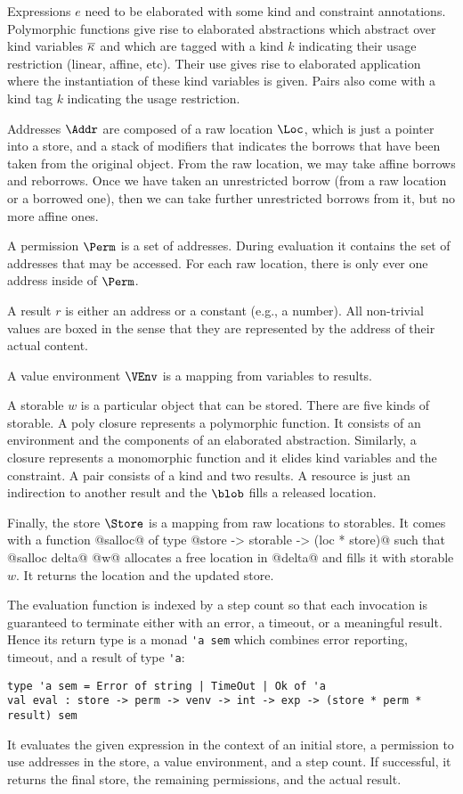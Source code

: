 Expressions $e$ need to be elaborated with some kind and constraint
annotations. Polymorphic functions give rise to elaborated
abstractions which abstract over kind variables $\overline{\kappa_{{}}}$ and
which are tagged with a kind $k$ indicating their usage restriction
(linear, affine, etc). Their use
gives rise to elaborated application where the instantiation of these
kind variables is given. Pairs also come with a kind tag $k$
indicating the usage restriction.

Addresses $\Addr$ are composed of a raw location $\Loc$, which is just
a pointer into a store, and a stack of modifiers that indicates the
borrows that have been taken from the original object. From the raw
location, we may take affine borrows and reborrows. Once we have
taken an unrestricted borrow (from a raw location or a borrowed one),
then we can take further unrestricted borrows from it, but no more
affine ones.

A permission $\Perm$ is a set of addresses. During evaluation it
contains the set of addresses that may be accessed. For each raw
location, there is only ever one address inside of $\Perm$.

A result $r$ is either an address or a constant (e.g., a number). All
non-trivial values are boxed in the sense that they are represented by
the address of their actual content.

A value environment $\VEnv$ is a mapping from variables to results.

A storable $w$ is a particular object that can be stored. There are five
kinds of storable. A poly closure represents a polymorphic
function. It consists of an environment and the components of an
elaborated abstraction. Similarly, a closure represents a monomorphic
function and it elides kind variables and the constraint. A pair
consists of a kind and two results. A resource is just an indirection
to another result and the $\blob $ fills a released location.

Finally, the store $\Store$ is a mapping from raw locations to
storables. It comes with a function
@salloc@ of type @store -> storable -> (loc * store)@ such that
@salloc delta@ @w@ allocates a free location in @delta@ and fills it with
storable $w$. It returns the location and the updated store.


The evaluation function is indexed by a step count so that each
invocation is guaranteed to terminate either with an error, a timeout,
or a meaningful result. Hence its return type is a monad
\lstinline/'a sem/ which combines error reporting, timeout, and a
result of type \lstinline/'a/:
\begin{lstlisting}
type 'a sem = Error of string | TimeOut | Ok of 'a
val eval : store -> perm -> venv -> int -> exp -> (store * perm * result) sem
\end{lstlisting}
It evaluates the given expression in the context of an initial store, a
permission to use addresses in the store, a value environment, and a
step count. If successful, it returns the final store, the remaining
permissions, and the actual result.

